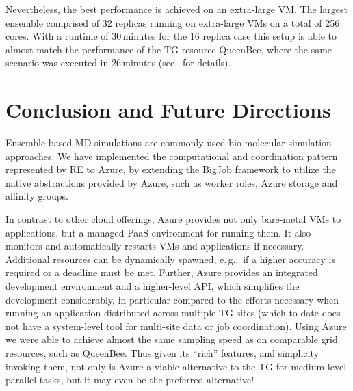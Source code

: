 \documentclass[conference,final]{IEEEtran}
\newcommand{\up}{\vspace*{-1em}}
\begin{document}
Nevertheless, the best performance is achieved on an extra-large
VM. The largest ensemble comprised of 32 replicas running on
extra-large VMs on a total of 256 cores.  With a runtime of
30\,minutes for the 16 replica case this setup is able to almost match
the performance of the TG resource QueenBee, where the same scenario
was executed in 26\,minutes (see~\cite{repex_ptrsb} for details).

\up
\section{Conclusion and Future Directions}
\up

Ensemble-based MD simulations %
are commonly used bio-molecular simulation
approaches. %
We have implemented the computational and coordination pattern
represented by RE to Azure, by extending the BigJob framework to
utilize the native abstractions provided by Azure, such as worker
roles, Azure storage and affinity groups.

In contrast to other cloud offerings, Azure provides not only
bare-metal VMs to applications, but a managed PaaS environment for
running them. It also monitors and automatically restarts VMs and
applications if necessary. Additional resources can be dynamically
spawned, e.\,g.,\ if a higher accuracy is required or a deadline must
be met. Further, Azure provides an integrated development environment
and a higher-level API, which simplifies the development considerably,
in particular compared to the efforts necessary when running an
application distributed across multiple TG sites (which to date does
not have a system-level tool for multi-site data or job
coordination). Using Azure we were able to achieve almost the same
sampling speed as on comparable grid resources, such as QueenBee.
Thus given its ``rich'' features, and simplicity invoking them, not
only is Azure a viable alternative to the TG for medium-level parallel
tasks, but it may even be the preferred alternative!
\end{document}
